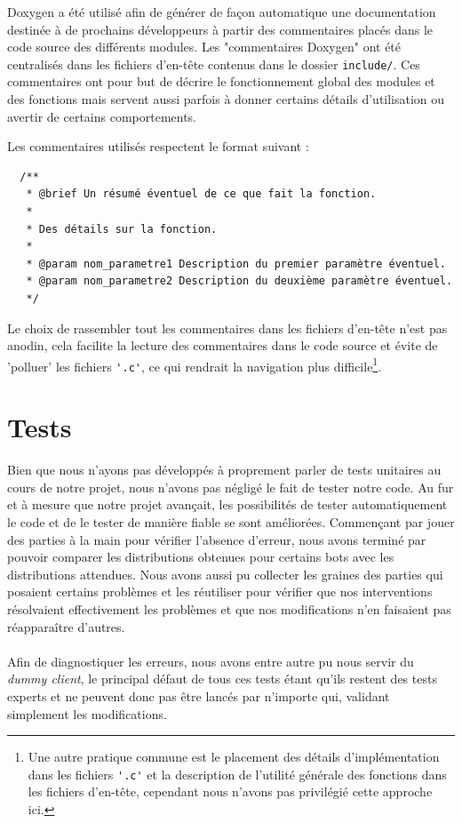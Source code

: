 \documentclass[a4paper,12pt]{article}
\begin{document}
Doxygen a été utilisé afin de générer de façon automatique une documentation
destinée à de prochains développeurs à partir des commentaires placés dans le
code source des différents modules. Les "commentaires Doxygen" ont été
centralisés dans les fichiers d'en-tête contenus dans le dossier
\verb!include/!. Ces commentaires ont pour but de décrire le fonctionnement
global des modules et des fonctions mais servent aussi parfois à donner
certains détails d'utilisation ou avertir de certains comportements.

Les commentaires utilisés respectent le format suivant :
\begin{verbatim}
  /**
   * @brief Un résumé éventuel de ce que fait la fonction.
   *
   * Des détails sur la fonction.
   *
   * @param nom_parametre1 Description du premier paramètre éventuel.
   * @param nom_parametre2 Description du deuxième paramètre éventuel.
   */
\end{verbatim}

Le choix de rassembler tout les commentaires dans les fichiers d'en-tête n'est
pas anodin, cela facilite la lecture des commentaires dans le code source et
évite de 'polluer' les fichiers \verb!'.c'!, ce qui rendrait la navigation
plus difficile\footnote{Une autre pratique commune est le placement des
détails d'implémentation dans les fichiers \verb!'.c'! et la description de
l'utilité générale des fonctions dans les fichiers d'en-tête, cependant nous
n'avons pas privilégié cette approche ici.}.

\section{Tests}
Bien que nous n'ayons pas développés à proprement parler de tests unitaires au
cours de notre projet, nous n'avons pas négligé le fait de tester notre code. Au
fur et à mesure que notre projet avançait, les possibilités de tester
automatiquement le code et de le tester de manière fiable se sont améliorées.
Commençant par jouer des parties à la main pour vérifier l'absence d'erreur,
nous avons terminé par pouvoir comparer les distributions obtenues pour certains
bots avec les distributions attendues. Nous avons aussi pu collecter les graines
des parties qui posaient certains problèmes et les réutiliser pour vérifier que
nos interventions résolvaient effectivement les problèmes et que nos
modifications n'en faisaient pas réapparaître d'autres.
\paragraph{}
Afin de diagnostiquer les erreurs, nous avons entre autre pu nous servir du
{\em dummy client}, le principal défaut de tous ces tests étant qu'ils restent
des tests experts et ne peuvent donc pas être lancés par n'importe qui, validant
simplement les modifications.
\end{document}
